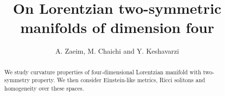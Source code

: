 \documentclass[11pt,oneside,leqno]{amsart}
\theoremstyle{plain}
\begin{document}
\title{On Lorentzian two-symmetric manifolds of dimension four}
\author{A. Zaeim, M. Chaichi and Y. Keshavarzi}
\date{}

\address{Department of Mathematics\\Payame noor University\\P.O. Box 19395-3697\\Tehran\\Iran.}

\begin{abstract}
We study curvature properties of four-dimensional Lorentzian manifold with two-symmetry property. We then consider Einstein-like metrics, Ricci solitons and homogeneity over these spaces.
\end{abstract}
\maketitle
\end{document}
